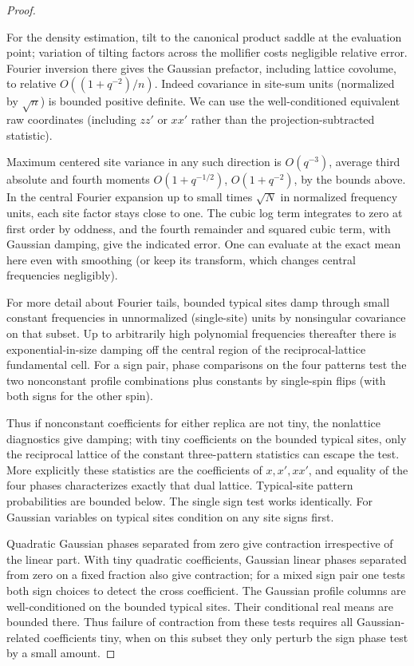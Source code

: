 \begin{proof}
\begin{itemize}
\end{itemize}
For the density estimation, tilt to the canonical product saddle at the evaluation point; variation of tilting factors across the mollifier costs negligible relative error. Fourier inversion there gives the Gaussian prefactor, including lattice covolume, to relative \(O((1+q^{-2})/n)\). Indeed covariance in site-sum units (normalized by \(\sqrt n\)) is bounded positive definite. We can use the well-conditioned equivalent raw coordinates (including \(zz'\) or \(xx'\) rather than the projection-subtracted statistic).

Maximum centered site variance in any such direction is \(O(q^{-3})\), average third absolute and fourth moments \(O(1+q^{-1/2})\), \(O(1+q^{-2})\), by the bounds above. In the central Fourier expansion up to small times \(\sqrt N\) in normalized frequency units, each site factor stays close to one. The cubic log term integrates to zero at first order by oddness, and the fourth remainder and squared cubic term, with Gaussian damping, give the indicated error. One can evaluate at the exact mean here even with smoothing (or keep its transform, which changes central frequencies negligibly).

For more detail about Fourier tails, bounded typical sites damp through small constant frequencies in unnormalized (single-site) units by nonsingular covariance on that subset. Up to arbitrarily high polynomial frequencies thereafter there is exponential-in-size damping off the central region of the reciprocal-lattice fundamental cell. For a sign pair, phase comparisons on the four patterns test the two nonconstant profile combinations plus constants by single-spin flips (with both signs for the other spin).

Thus if nonconstant coefficients for either replica are not tiny, the nonlattice diagnostics give damping; with tiny coefficients on the bounded typical sites, only the reciprocal lattice of the constant three-pattern statistics can escape the test. More explicitly these statistics are the coefficients of \(x,x',xx'\), and equality of the four phases characterizes exactly that dual lattice. Typical-site pattern probabilities are bounded below. The single sign test works identically. For Gaussian variables on typical sites condition on any site signs first.

Quadratic Gaussian phases separated from zero give contraction irrespective of the linear part. With tiny quadratic coefficients, Gaussian linear phases separated from zero on a fixed fraction also give contraction; for a mixed sign pair one tests both sign choices to detect the cross coefficient. The Gaussian profile columns are well-conditioned on the bounded typical sites. Their conditional real means are bounded there. Thus failure of contraction from these tests requires all Gaussian-related coefficients tiny, when on this subset they only perturb the sign phase test by a small amount.


\end{proof}
